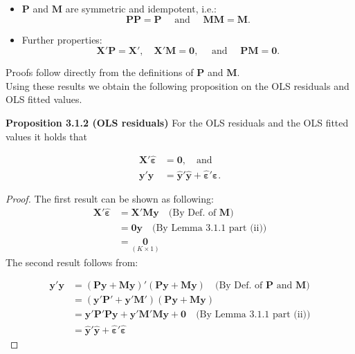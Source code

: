 \documentclass[]{book}
\theoremstyle{definition}
\theoremstyle{definition}
\theoremstyle{definition}
\theoremstyle{remark}
\let\BeginKnitrBlock\begin \let\EndKnitrBlock\end
\begin{document}
\begin{itemize}
\item
  \(\mathbf{P}\) and \(\mathbf{M}\) are symmetric and idempotent, i.e.:
  \[\mathbf{P}\mathbf{P}=\mathbf{P}\quad\text{ and }\quad \mathbf{M}\mathbf{M}=\mathbf{M}.\]
\item
  Further properties:
  \[\mathbf{X}'\mathbf{P}=\mathbf{X}',\quad \mathbf{X}'\mathbf{M}=\mathbf{0},\quad\text{ and }\quad \mathbf{P}\mathbf{M}=\mathbf{0}.\]
\end{itemize}

Proofs follow directly from the definitions of \(\mathbf{P}\) and
\(\mathbf{M}\).\\
Using these results we obtain the following proposition on the OLS
residuals and OLS fitted values.

\textbf{Proposition 3.1.2 (OLS residuals)}
For the OLS residuals and the OLS fitted values it holds that

\[
\begin{align*}
    \mathbf{X}'\hat{\boldsymbol{\varepsilon}} &= \mathbf{0}, \quad\text{and}\\
    \mathbf{y}'\mathbf{y} &= \hat{\mathbf{y}}'\hat{\mathbf{y}}+\hat{\boldsymbol{\varepsilon}}'\hat{\boldsymbol{\varepsilon}}.
\end{align*}
\]

\BeginKnitrBlock{proof}
{}The first result can be shown as following:
\begin{align*}
  \mathbf{X}'\hat{\boldsymbol{\varepsilon}} 
   &= \mathbf{X}'\mathbf{M}\mathbf{y}\quad\text{(By Def. of $\mathbf{M}$)}\\
   &= \mathbf{0}\mathbf{y}\quad\text{(By Lemma 3.1.1 part (ii))}\\
   &= \underset{(K\times 1)}{\mathbf{0}}
\end{align*}
The second result follows from:

\begin{align*}
  \mathbf{y}'\mathbf{y} &= (\mathbf{P}\mathbf{y}+\mathbf{M}\mathbf{y})'(\mathbf{P}\mathbf{y}+\mathbf{M}\mathbf{y})\quad\text{(By Def.~of $\mathbf{P}$ and $\mathbf{M}$)}\\
   &= (\mathbf{y}'\mathbf{P}'+\mathbf{y}'\mathbf{M}')(\mathbf{P}\mathbf{y}+\mathbf{M}\mathbf{y})\\
   &= \mathbf{y}'\mathbf{P}'\mathbf{P}\mathbf{y}+\mathbf{y}'\mathbf{M}'\mathbf{M}\mathbf{y}+\mathbf{0}\quad\text{(By Lemma 3.1.1 part (ii))}\\
   &= \hat{\mathbf{y}}'\hat{\mathbf{y}}+\hat{\boldsymbol{\varepsilon}}'\hat{\boldsymbol{\varepsilon}}
\end{align*}
\EndKnitrBlock{proof}
\end{document}
